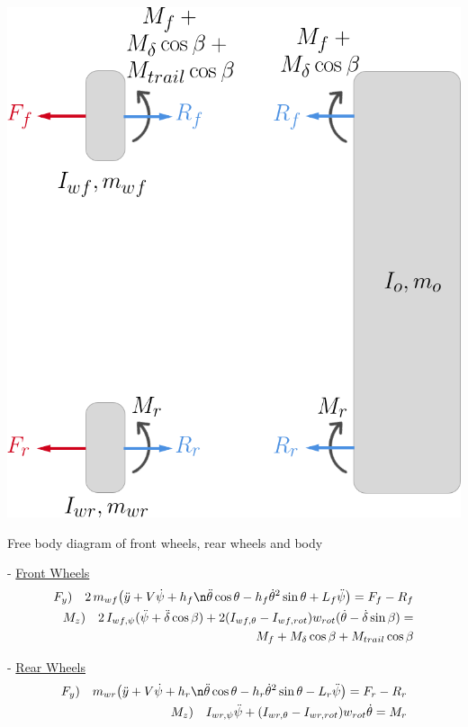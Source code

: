 \begin{marginfigure}[-0.5pt]
	\includegraphics[width=1.3\linewidth]{figs/02/body_1}
	\caption{Free body diagram of front wheels, rear wheels and body}
	\label{body_1}
\end{marginfigure}
- \underline{Front Wheels}
\begin{eqnarray}
F_{y}) \quad 2\,m_{wf}\big(\ddot{y}+V\dot{\psi}+h_{f}\n\ddot{\theta}\cos\theta-h_{f}\dot{\theta}^2\sin\theta+L_{f}\ddot{\psi}\big)=F_{f}-R_{f} \\
M_{z}) \quad 2\,I_{wf,\psi}(\ddot{\psi}+\ddot{\delta}\cos\beta)+2(I_{wf,\theta}-I_{wf,rot})w_{rot}(\dot{\theta}-\dot{\delta}\sin\beta)=\notag\\
\quad\quad M_{f}+M_{\delta}\cos\beta+M_{trail}\cos\beta
\end{eqnarray}

- \underline{Rear Wheels}
\begin{eqnarray}
F_{y}) \quad m_{wr}\big(\ddot{y}+V\dot{\psi}+h_{r}\n\ddot{\theta}\cos\theta-h_{r}\dot{\theta}^2\sin\theta-L_{r}\ddot{\psi}\big)=F_{r}-R_{r} \\
M_{z}) \quad I_{wr,\psi}\ddot{\psi}+(I_{wr,\theta}-I_{wr,rot})w_{rot}\dot{\theta}=M_{r}
\end{eqnarray}

